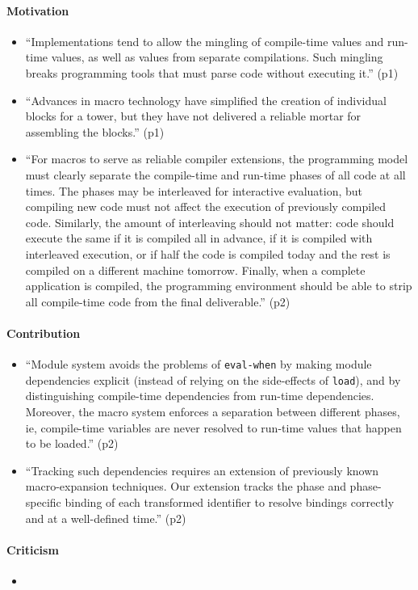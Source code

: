 \documentclass[12pt]{article}	%
\begin{document}
\paragraph{Motivation}
\begin{itemize}
	\item ``Implementations tend to allow the mingling of compile-time values and run-time values, as well as values from separate compilations. Such mingling breaks programming tools that must parse code without executing it.'' (p1)
	\item ``Advances in macro technology have simplified the creation of individual blocks for a tower, but they have not delivered a reliable mortar for assembling the blocks.'' (p1)
	\item ``For macros to serve as reliable compiler extensions, the programming model must clearly separate the compile-time and run-time phases of all code at all times. The phases may be interleaved for interactive evaluation, but compiling new code must not affect the execution of previously compiled code. Similarly, the amount of interleaving should not matter: code should execute the same if it is compiled all in advance, if it is compiled with interleaved execution, or if half the code is compiled today and the rest is compiled on a different machine tomorrow. Finally, when a complete application is compiled, the programming environment should be able to strip all compile-time code from the final deliverable.'' (p2)
\end{itemize}
\paragraph{Contribution}
\begin{itemize}
	\item ``Module system avoids the problems of \verb!eval-when! by making module dependencies explicit (instead of relying on the side-effects of \verb!load!), and by distinguishing compile-time dependencies from run-time dependencies. Moreover, the macro system enforces a separation between different phases, ie, compile-time variables are never resolved to run-time values that happen to be loaded.'' (p2)
	\item ``Tracking such dependencies requires an extension of previously known macro-expansion techniques. Our extension tracks the phase and phase-specific binding of each transformed identifier to resolve bindings correctly and at a well-defined time.'' (p2) 
\end{itemize}
\paragraph{Criticism}
\begin{itemize}
	\item
\end{itemize}
\end{document}
